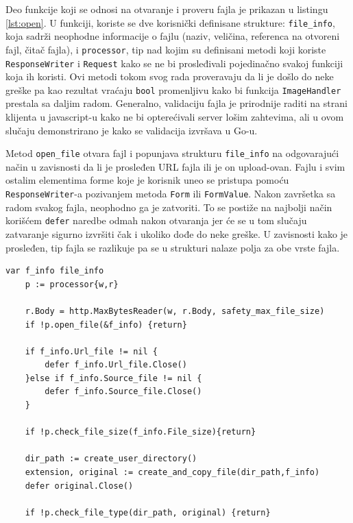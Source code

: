\documentclass[12pt,oneside]{memoir}
\begin{document}
Deo funkcije koji se odnosi na otvaranje i proveru fajla je prikazan u listingu \ref{lst:open}. U funkciji, koriste se dve korisnički definisane strukture: \texttt{file\_info}, koja sadrži neophodne informacije o fajlu (naziv, veličina, referenca na otvoreni fajl, čitač fajla), i \texttt{processor}, tip nad kojim su definisani metodi koji koriste \texttt{ResponseWriter} i \texttt{Request} kako se ne bi prosleđivali pojedinačno svakoj funkciji koja ih koristi. Ovi metodi tokom svog rada proveravaju da li je došlo do neke greške pa kao rezultat vraćaju \texttt{bool} promenljivu kako bi funkcija \texttt{ImageHandler} prestala sa daljim radom. Generalno, validaciju fajla je prirodnije raditi na strani klijenta u javascript-u kako ne bi opterećivali server lošim zahtevima, ali u ovom slučaju demonstrirano je kako se validacija izvršava u Go-u.

Metod \texttt{open\_file} otvara fajl i popunjava strukturu \texttt{file\_info} na odgovarajući način u zavisnosti da li je prosleđen URL fajla ili je on upload-ovan. Fajlu i svim ostalim elementima forme koje je korisnik uneo se pristupa pomoću \texttt{ResponseWriter}-a pozivanjem metoda \texttt{Form} ili \texttt{FormValue}. Nakon završetka sa radom svakog fajla, neophodno ga je zatvoriti. To se postiže na najbolji način korišćem \texttt{defer} naredbe odmah nakon otvaranja jer će se u tom slučaju zatvaranje sigurno izvršiti čak i ukoliko dođe do neke greške. U zavisnosti kako je prosleđen, tip fajla se razlikuje pa se u strukturi nalaze polja za obe vrste fajla. 


\begin{center}
\begin{lstlisting}[caption=Otvaranje i provera fajla u funkciji ImageHandler,label={lst:open},float,  backgroundcolor=\color{background}]
	var f_info file_info
	p := processor{w,r}

	r.Body = http.MaxBytesReader(w, r.Body, safety_max_file_size)
	if !p.open_file(&f_info) {return}

	if f_info.Url_file != nil {
		defer f_info.Url_file.Close()
	}else if f_info.Source_file != nil {
		defer f_info.Source_file.Close()
	}

	if !p.check_file_size(f_info.File_size){return}

	dir_path := create_user_directory()
	extension, original := create_and_copy_file(dir_path,f_info)
	defer original.Close()

	if !p.check_file_type(dir_path, original) {return}
\end{lstlisting}
\end{center}
\end{document}
